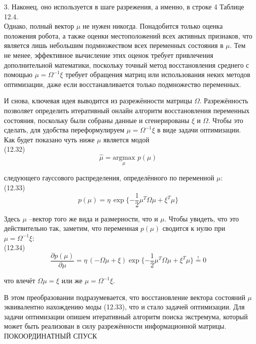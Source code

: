 \documentclass[10pt,a4paper]{article}
\begin{document}
3.	Наконец, оно используется в шаге разрежения, а именно, в строке 4 Таблице 12.4.\\

Однако, полный вектор $\mu$ не нужен никогда. Понадобится только оценка положения робота, а также оценки местоположений всех активных признаков, что является лишь небольшим подмножеством всех переменных состояния в $\mu$. Тем не менее, эффективное вычисление этих оценок требует привлечения дополнительной математики, поскольку точный метод восстановления среднего с помощью $\mu=\varOmega^{-1}\xi$ требует обращения матриц или использования неких методов оптимизации, даже если восстанавливается только подмножество переменных.

И снова, ключевая идея выводится из разрежённости матрицы $\varOmega$. Разрежённость позволяет определить итеративный онлайн алгоритм восстановления переменных состояния, поскольку были собраны данные и сгенерированы $\xi$ и $\varOmega$. Чтобы это сделать, для удобства переформулируем  $\mu=\varOmega^{-1}\xi$ в виде задачи оптимизации. Как будет показано чуть ниже $\mu$ является модой\\

(12.32)
$$\hat{\mu}=\underset{\mu}{\text{argmax}}\,\,p(\mu)$$

следующего гауссового распределения, определённого по переменной $\mu$:\\

(12.33)
$$p(\mu)=\eta\,\exp\{-\frac{1}{2}\mu^T\varOmega\mu+\xi^T\mu\}$$

Здесь $\mu$ –вектор того же вида и размерности, что и $\mu$. Чтобы увидеть, что это действительно так, заметим, что переменная $p(\mu)$ сводится к нулю при $\mu=\varOmega^{-1}\xi$:\\

(12.34)
$$\frac{\partial p(\mu)}{\partial\mu}=\eta\,(-\varOmega\mu+\xi)\exp\{-\frac{1}{2}\mu^T\varOmega\mu+\xi^T\mu\}\overset{!}{=}0$$

что влечёт $\varOmega\mu=\xi$ или же $\mu=\varOmega^{-1}\xi$.

В этом преобразовании подразумевается, что восстановление вектора состояний $\mu$ эквивалентно нахождению моды (12.33), что и стало задачей оптимизации. Для задачи оптимизации опишем итеративный алгоритм поиска экстремума, который может быть реализован в силу разрежённости информационной матрицы.\\

ПОКООРДИНАТНЫЙ СПУСК\\
\end{document}
